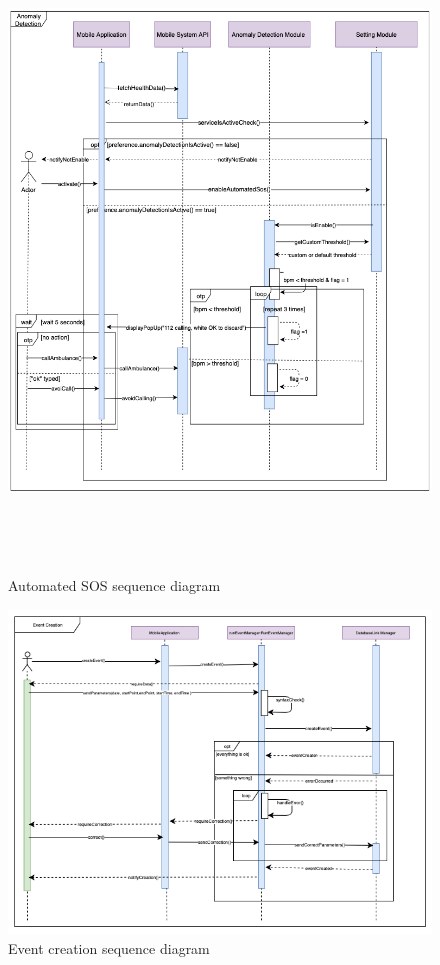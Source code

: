 \documentclass[DD.tex]{subfiles}
\begin{document}
\begin{figure}[h!]
\centering
\includegraphics[height=17.00cm,keepaspectratio]{Figures/AutomatedSOS}
\caption{Automated SOS sequence diagram}
\end{figure}

\begin{figure}
\centering
\includegraphics[width=\textwidth]{Figures/EventCreation}
\caption{Event creation sequence diagram}
\end{figure}

\newpage
\end{document}
